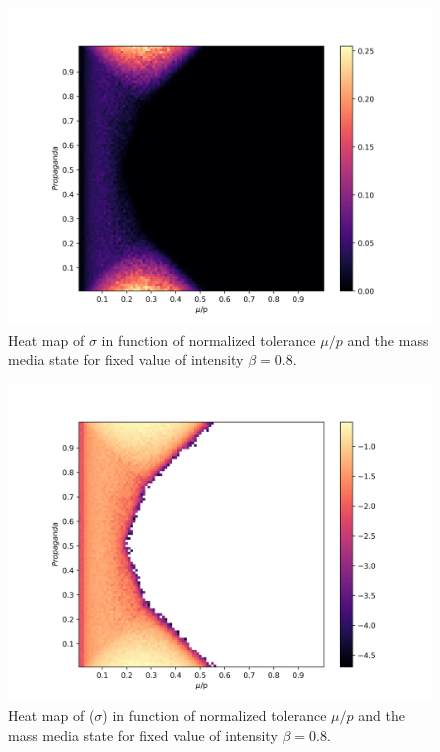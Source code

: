 \documentclass[%
 reprint,
 amsmath,amssymb,
 aps,
]{revtex4-2}
\begin{document}
\begin{figure}
    \centering
    \includegraphics[scale = 0.45]{images/sigma_prop_vs_mu_b08.png}
    \caption{Heat map of $\sigma$ in function of normalized tolerance $\mu/p$ and the mass media state for fixed value of intensity $\beta = 0.8$.}
    \label{fig:sigma_prop_vs_tolerance_i08}
\end{figure}
\begin{figure}
    \centering
    \includegraphics[scale = 0.45]{images/log_sigma_prop_vs_mu_b08.png}
    \caption{Heat map of \log($\sigma$) in function of normalized tolerance $\mu/p$ and the mass media state for fixed value of intensity $\beta = 0.8$.}
    \label{fig:logsigma_prop_vs_tolerance_i08}
\end{figure}
\end{document}
